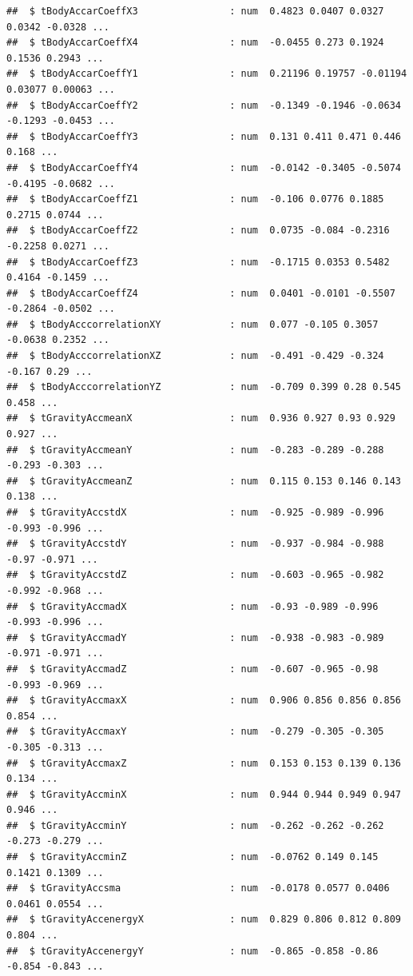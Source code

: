 \documentclass[
]{article}
\begin{document}
\begin{verbatim}
##  $ tBodyAccarCoeffX3                : num  0.4823 0.0407 0.0327 0.0342 -0.0328 ...
##  $ tBodyAccarCoeffX4                : num  -0.0455 0.273 0.1924 0.1536 0.2943 ...
##  $ tBodyAccarCoeffY1                : num  0.21196 0.19757 -0.01194 0.03077 0.00063 ...
##  $ tBodyAccarCoeffY2                : num  -0.1349 -0.1946 -0.0634 -0.1293 -0.0453 ...
##  $ tBodyAccarCoeffY3                : num  0.131 0.411 0.471 0.446 0.168 ...
##  $ tBodyAccarCoeffY4                : num  -0.0142 -0.3405 -0.5074 -0.4195 -0.0682 ...
##  $ tBodyAccarCoeffZ1                : num  -0.106 0.0776 0.1885 0.2715 0.0744 ...
##  $ tBodyAccarCoeffZ2                : num  0.0735 -0.084 -0.2316 -0.2258 0.0271 ...
##  $ tBodyAccarCoeffZ3                : num  -0.1715 0.0353 0.5482 0.4164 -0.1459 ...
##  $ tBodyAccarCoeffZ4                : num  0.0401 -0.0101 -0.5507 -0.2864 -0.0502 ...
##  $ tBodyAcccorrelationXY            : num  0.077 -0.105 0.3057 -0.0638 0.2352 ...
##  $ tBodyAcccorrelationXZ            : num  -0.491 -0.429 -0.324 -0.167 0.29 ...
##  $ tBodyAcccorrelationYZ            : num  -0.709 0.399 0.28 0.545 0.458 ...
##  $ tGravityAccmeanX                 : num  0.936 0.927 0.93 0.929 0.927 ...
##  $ tGravityAccmeanY                 : num  -0.283 -0.289 -0.288 -0.293 -0.303 ...
##  $ tGravityAccmeanZ                 : num  0.115 0.153 0.146 0.143 0.138 ...
##  $ tGravityAccstdX                  : num  -0.925 -0.989 -0.996 -0.993 -0.996 ...
##  $ tGravityAccstdY                  : num  -0.937 -0.984 -0.988 -0.97 -0.971 ...
##  $ tGravityAccstdZ                  : num  -0.603 -0.965 -0.982 -0.992 -0.968 ...
##  $ tGravityAccmadX                  : num  -0.93 -0.989 -0.996 -0.993 -0.996 ...
##  $ tGravityAccmadY                  : num  -0.938 -0.983 -0.989 -0.971 -0.971 ...
##  $ tGravityAccmadZ                  : num  -0.607 -0.965 -0.98 -0.993 -0.969 ...
##  $ tGravityAccmaxX                  : num  0.906 0.856 0.856 0.856 0.854 ...
##  $ tGravityAccmaxY                  : num  -0.279 -0.305 -0.305 -0.305 -0.313 ...
##  $ tGravityAccmaxZ                  : num  0.153 0.153 0.139 0.136 0.134 ...
##  $ tGravityAccminX                  : num  0.944 0.944 0.949 0.947 0.946 ...
##  $ tGravityAccminY                  : num  -0.262 -0.262 -0.262 -0.273 -0.279 ...
##  $ tGravityAccminZ                  : num  -0.0762 0.149 0.145 0.1421 0.1309 ...
##  $ tGravityAccsma                   : num  -0.0178 0.0577 0.0406 0.0461 0.0554 ...
##  $ tGravityAccenergyX               : num  0.829 0.806 0.812 0.809 0.804 ...
##  $ tGravityAccenergyY               : num  -0.865 -0.858 -0.86 -0.854 -0.843 ...

\end{verbatim}
\end{document}
